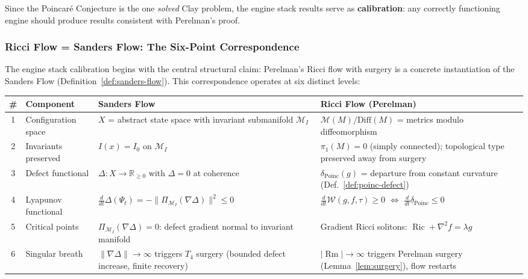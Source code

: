 \documentclass[11pt]{article}
\DeclareMathOperator{\Ric}{Ric}
\DeclareMathOperator{\Rm}{Rm}
\begin{document}
\noindent
Since the Poincar\'e Conjecture is the one \emph{solved} Clay problem, the engine
stack results serve as \textbf{calibration}: any correctly functioning engine should
produce results consistent with Perelman's proof.

\subsubsection{Ricci Flow = Sanders Flow: The Six-Point Correspondence}
\label{subsubsec:ricci-sanders}

The engine stack calibration begins with the central structural claim:
Perelman's Ricci flow with surgery is a concrete instantiation of the
Sanders Flow (Definition~\ref{def:sanders-flow}).  This correspondence
operates at six distinct levels:

\begin{center}
\renewcommand{\arraystretch}{1.25}
\begin{tabular}{@{}clp{5cm}p{5cm}@{}}
\toprule
\textbf{\#} & \textbf{Component} & \textbf{Sanders Flow} & \textbf{Ricci Flow (Perelman)} \\
\midrule
1 & Configuration space &
  $X$ = abstract state space with invariant submanifold $\mathcal{M}_I$ &
  $\mathcal{M}(M)/\mathrm{Diff}(M)$ = metrics modulo diffeomorphism \\
2 & Invariants preserved &
  $I(x) = I_0$ on $\mathcal{M}_I$ &
  $\pi_1(M) = 0$ (simply connected); topological type preserved away from surgery \\
3 & Defect functional &
  $\Delta : X \to \mathbb{R}_{\geq 0}$ with $\Delta = 0$ at coherence &
  $\delta_{\mathrm{Poinc}}(g)$ = departure from constant curvature (Def.~\ref{def:poinc-defect}) \\
4 & Lyapunov functional &
  $\frac{d}{dt}\Delta(\Psi_t) = -\|\Pi_{\mathcal{M}_I}(\nabla\Delta)\|^2 \leq 0$ &
  $\frac{d}{dt}\mathcal{W}(g,f,\tau) \geq 0$ $\Leftrightarrow$ $\frac{d}{dt}\delta_{\mathrm{Poinc}} \leq 0$ \\
5 & Critical points &
  $\Pi_{\mathcal{M}_I}(\nabla\Delta) = 0$: defect gradient normal to invariant manifold &
  Gradient Ricci solitons: $\Ric + \nabla^2 f = \lambda g$ \\
6 & Singular breath &
  $\|\nabla\Delta\| \to \infty$ triggers $T_4$ surgery (bounded defect increase, finite recovery) &
  $|\Rm| \to \infty$ triggers Perelman surgery (Lemma~\ref{lem:surgery}), flow restarts \\
\bottomrule
\end{tabular}
\end{center}
\end{document}
